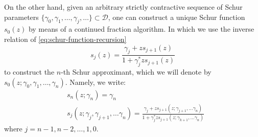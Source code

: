 \documentclass[
	preprint,%
	aps,
	prb,
	showpacs,	
	amsmath, amssymb]{revtex4-2}
\newcommand{\D}{ {\mathcal{D}} }
\begin{document}
On the other hand, given an arbitrary strictly contractive sequence 
of Schur parameters $\{\gamma_0, \gamma_1, \dots, \gamma_j, \dots\} \subset \D$, 
one can construct a unique Schur function $s_0(z)$ by means of a continued 
fraction algorithm. In which we use the inverse relation of
\cref{eq:schur-function-recursion}
\begin{equation}\label{eq:inv-schur-function-recursion}
	s_j(z) = \frac{\gamma_j + zs_{j+1}(z)}{1 + \gamma_j^* z s_{j+1}(z)}
\end{equation}
to construct the $n$-th Schur approximant, 
which we will denote by 
$s_0(z; \gamma_0,\gamma_1, \dots, \gamma_n)$. Namely, we write:
\begin{align}
	\label{eq:schur-continued-fraction-1}
	&s_n(z;\gamma_n) = \gamma_n \\
	\label{eq:schur-continued-fraction-2}
	&s_j(z;\gamma_j,\gamma_{j+1},\dots \gamma_n) 
	= \frac{\gamma_j + zs_{j+1}(z;\gamma_{j+1},\dots \gamma_n)}
		{1 + \gamma_j^* z s_{j+1}(z;\gamma_{k+1},\dots \gamma_n)}
\end{align}
where $j = n-1, n-2, \dots, 1, 0$.
\end{document}
